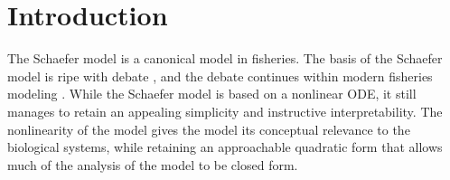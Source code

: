 %
\section{Introduction\label{ptInt}}


%
The Schaefer model is a canonical model in fisheries. %
The basis of the Schaefer model is ripe with debate \cite{kingsland_refractory_1982},
and the debate continues within modern fisheries modeling \cite{prager_comparison_2002, maunder_is_2003, prager_reply_2003}.
While the Schaefer model is based on a nonlinear ODE, it still manages to retain 
an appealing simplicity and instructive interpretability. %
The nonlinearity of the model gives the model its conceptual relevance to the 
biological systems, while retaining an approachable quadratic form that allows 
much of the analysis of the model to be closed form.  


